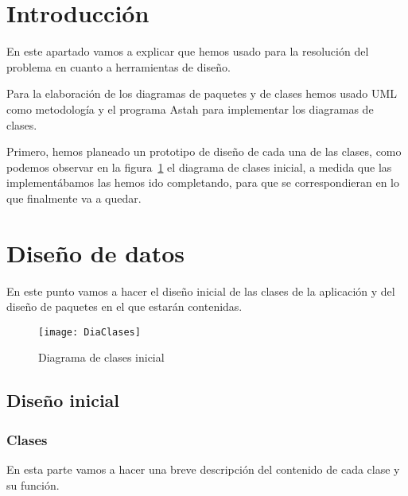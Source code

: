 
\section{Introducción}

En este apartado vamos a explicar que hemos usado para la resolución del problema en cuanto a herramientas de diseño.

Para la elaboración de los diagramas de paquetes y de clases hemos usado UML como metodología y el programa Astah para implementar los diagramas de clases.

Primero, hemos planeado un prototipo de diseño de cada una de las clases, como podemos observar en la figura~\ref{fig:C.1.1} el diagrama de clases inicial, a medida que las implementábamos las hemos ido completando, para que se correspondieran en lo que finalmente va a quedar.



\section{Diseño de datos}

En este punto vamos a hacer el diseño inicial de las clases de la aplicación y del diseño de paquetes en el que estarán contenidas.

\begin{figure}[h]
	\centering
	\texttt{[image: DiaClases]}
	\caption{Diagrama de clases inicial}
	\label{fig:C.1.1}
\end{figure}
 

\subsection{Diseño inicial}
\subsubsection{Clases}
En esta parte vamos a hacer una breve descripción del contenido de cada clase y su función.

